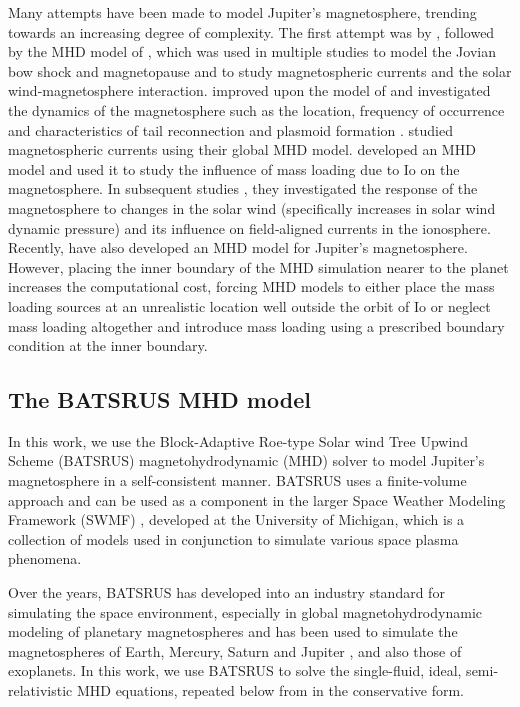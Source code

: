 Many attempts have been made to model Jupiter's magnetosphere, trending towards an increasing degree of complexity. The first attempt was by , followed by the MHD model of , which was used in multiple studies to model the Jovian bow shock and magnetopause  and to study magnetospheric currents and the solar wind‐magnetosphere interaction.  improved upon the model of   and investigated the dynamics of the magnetosphere such as the location, frequency of occurrence and characteristics of tail reconnection and plasmoid formation \cite{Fukazawa2010a}. \cite{Moriguchi2008} studied magnetospheric currents using their global MHD model. \cite{Chane2013a} developed an MHD model and used it to study the influence of mass loading due to Io on the magnetosphere. In subsequent studies \cite{Chane2017a,Chane2018}, they investigated the response of the magnetosphere to changes in the solar wind (specifically increases in solar wind dynamic pressure) and its influence on field‐aligned currents in the ionosphere. Recently,  have also developed an MHD model for Jupiter's magnetosphere. However, placing the inner boundary of the MHD simulation nearer to the planet increases the computational cost, forcing MHD models to either place the mass loading sources at an unrealistic location well outside the orbit of Io or neglect mass loading altogether and introduce mass loading using a prescribed boundary condition at the inner boundary. 

\subsection{The BATSRUS MHD model}
In this work, we use the Block-Adaptive Roe-type Solar wind Tree Upwind Scheme (BATSRUS) magnetohydrodynamic (MHD) solver to model Jupiter's magnetosphere in a self-consistent manner. BATSRUS uses a finite-volume approach and can be used as a component in the larger Space Weather Modeling Framework (SWMF) \cite{Toth2012a}, developed at the University of Michigan, which is a collection of models used in conjunction to simulate various space plasma phenomena. 

Over the years, BATSRUS has developed into an industry standard for simulating the space environment, especially in global magnetohydrodynamic modeling of planetary magnetospheres and has been used to simulate the magnetospheres of Earth, Mercury, Saturn \cite{Jia2012} and Jupiter \cite{Hansen2001a}, and also those of exoplanets. In this work, we use BATSRUS to solve the single-fluid, ideal, semi-relativistic MHD equations, repeated below from  in the conservative form. 

